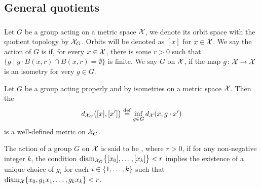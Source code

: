 
\subsection{General quotients}

\subsubsection{}


Let $G$ be a group acting on a metric space $\cX$, we denote its orbit space with the quotient topology by $\cX_G$.
Orbits will be denoted as $[x]$ for $x \in \cX$.
We say the action of $G$ is  if, for every $x \in \cX$, there is some $r>0$ such that $\{g \mid g\cdot B(x,r) \cap B(x,r) = \emptyset\}$ is finite.
We say $G$  on $\cX$, if the map $g \colon \cX \to \cX$ is an isometry for very $g \in G$.

Let $G$ be a group acting properly and by isometries on a metric space $\cX$.
Then the 
\[
d_{\cX_G}\big([x], [x']\big) \defeq \inf_{g\in G} d_\cX(x, g\cdot x')
\]
is a well-defined metric on $\cX_G$.

The action of a group $G$ on $\cX$ is said to be , where $r > 0$, if for any non-negative integer $k$, the condition $\diam_{\cX_G}\set[\big]{[x_0],\dots,[x_k]} < r$ implies the existence of a unique choice of $g_i$ for each $i \in \set{1,\dots,k}$ such that $\diam_{\cX}\set{x_0, g_1x_1, \dots, g_kx_k} < r$.

\subsubsection{}\label{subsub:h}

